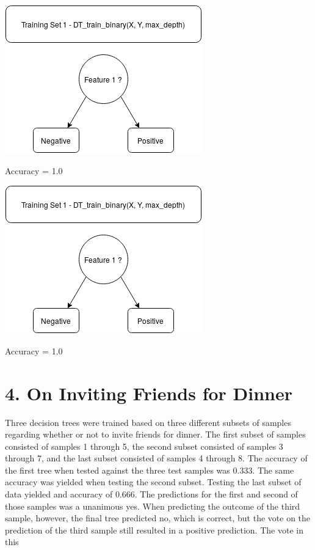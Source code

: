 \documentclass{article}
\begin{document}
\begin{center}
    \includegraphics[scale=0.75]{Train1.png}
    
    \noindent Accuracy = 1.0
    
\end{center}

\begin{center}
    \includegraphics[scale=0.75]{Train1.png}
    
    \noindent Accuracy = 1.0
    
\end{center}

\section*{4. On Inviting Friends for Dinner}

\indent Three decision trees were trained based on three different subsets of samples regarding whether or not to invite friends for dinner. The first subset of samples consisted of samples 1 through 5, the second subset consisted of samples 3 through 7, and the last subset consisted of samples 4 through 8. The accuracy of the first tree when tested against the three test samples was 0.333. The same accuracy was yielded when testing the second subset. Testing the last subset of data yielded and accuracy of 0.666. The predictions for the first and second of those samples was a unanimous yes. When predicting the outcome of the third sample, however, the final tree predicted no, which is correct, but the vote on the prediction of the third sample still resulted in a positive prediction. The vote in this 
\end{document}
